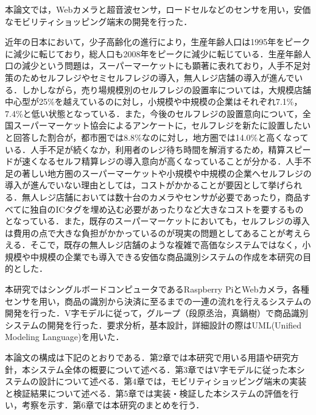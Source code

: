 


本論文では，Webカメラと超音波センサ，ロードセルなどのセンサを用い，安価なモビリティショッピング端末の開発を行った．

近年の日本において，少子高齢化の進行により，生産年齢人口は1995年をピークに減少に転じており，総人口も2008年をピークに減少に転じている\cite{population}．生産年齢人口の減少という問題は，スーパーマーケットにも顕著に表れており，人手不足対策のためセルフレジやセミセルフレジの導入，無人レジ店舗の導入が進んでいる．しかしながら，売り場規模別のセルフレジの設置率については，大規模店舗中心型が25\%を越えているのに対し，小規模や中規模の企業はそれぞれ7.1\%，7.4\%\cite{super}と低い状態となっている．また，今後のセルフレジの設置意向について，全国スーパーマーケット協会によるアンケートに，セルフレジを新たに設置したいと回答した割合が，都市圏では8.8\%なのに対し，地方圏では14.0\%\cite{super}と高くなっている．人手不足が続くなか，利用者のレジ待ち時間を解消するため，精算スピードが速くなるセルフ精算レジの導入意向が高くなっていることが分かる\cite{super}．人手不足の著しい地方圏のスーパーマーケットや小規模や中規模の企業へセルフレジの導入が進んでいない理由としては，コストがかかることが要因として挙げられる．無人レジ店舗においては数十台のカメラやセンサが必要であったり，商品すべてに独自のICタグを埋め込む必要があったりなど大きなコストを要するものとなっている．また，既存のスーパーマーケットにおいても，セルフレジの導入は費用の点で大きな負担がかかっているのが現実の問題としてあることが考えらえる．そこで，既存の無人レジ店舗のような複雑で高価なシステムではなく，小規模や中規模の企業でも導入できる安価な商品識別システムの作成を本研究の目的とした．

本研究ではシングルボードコンピュータであるRaspberry PiとWebカメラ，各種センサを用い，商品の識別から決済に至るまでの一連の流れを行えるシステムの開発を行った．V字モデルに従って，グループ（段原丞治，真鍋樹）で商品識別システムの開発を行った．要求分析，基本設計，詳細設計の際はUML(Unified Modeling Language)を用いた．

本論文の構成は下記のとおりである．第2章では本研究で用いる用語や研究方針，本システム全体の概要について述べる．第3章ではV字モデルに従った本システムの設計について述べる．第4章では，モビリティショッピング端末の実装と検証結果について述べる．第5章では実装・検証した本システムの評価を行い，考察を示す．第6章では本研究のまとめを行う．
